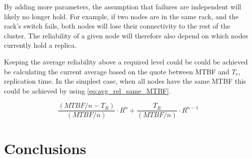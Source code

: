 \documentclass{cslthse-msc}
\begin{document}
By adding more parameters, the assumption that failures are independent will likely no longer hold. For example, if two nodes are in the same rack, and the rack's switch fails, both nodes will lose their connectivity to the rest of the cluster. The reliability of a given node will therefore also depend on which nodes currently hold a replica.

Keeping the average reliability above a required level could be could be achieved be calculating the current average based on the quote between MTBF and \emph{$T_r$}, replication time.
In the simplest case, when all nodes have the same MTBF this could be achieved by using \cref{eq:avg_rel_same_MTBF}.

\begin{equation} \label{eq:avg_rel_same_MTBF}
	\frac{(MTBF/n - T_{R})}{(MTBF/n)} \cdot R^n + \frac{T_{R}}{(MTBF/n)} \cdot R^{n-1}
\end{equation}

\chapter{Conclusions} \label{ch:conclusions}
\end{document}
